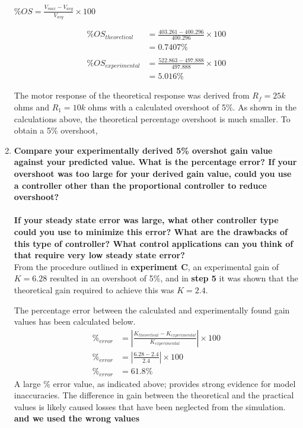 \documentclass[11pt,a4paper]{article}
\begin{document}
\begin{enumerate}
	\begin{center}
		$\%OS = \frac{V_{max} - V_{avg}}{V_{avg}} \times 100$
	\end{center}
	\begin{align*}		
	    \%OS_{theoretical} &= \frac{403.261 - 400.296}{400.296} \times 100 \\
	    &= 0.7407\% \\\\
	    \%OS_{experimental} &= \frac{522.863 - 497.888}{497.888} \times 100 \\
	    &= 5.016\% 
	\end{align*}

	The motor response of the theoretical response was derived from $R_f = 25k$ ohms and $R_1 = 10k$ ohms with a calculated overshoot of 5\%. As shown in the calculations above, the theoretical percentage overshoot is much smaller. To obtain a 5\% overshoot, \\

    

    \pagebreak
	\item \textbf{Compare your experimentally derived 5\% overshot gain value against your predicted value. What is the percentage error? If your overshoot was too large for your derived gain value, could you use a controller other than the proportional controller to reduce overshoot? \\\\
If your steady state error was large, what other controller type could you use to minimize this error? What are  the drawbacks of  this  type of controller? What control applications can you think of that require very low steady state error?}\\

From the procedure outlined in \textbf{experiment C}, an experimental gain of $K = 6.28$ resulted in an overshoot of 5\%, and in \textbf{step 5} it was shown that the theoretical gain required to achieve this was $K = 2.4$.

The percentage error between the calculated and experimentally found gain values has been calculated below.
\begin{align*}
\%_{error} &= |\frac{K_{theoretical} - K_{experimental}}{K_{experimental}}| \times 100 \\
\%_{error} &= |\frac{6.28 - 2.4}{2.4}| \times 100 \\
\%_{error} &= 61.8\% 
\end{align*}
A large \% error value, as indicated above; provides strong evidence for model inaccuracies. The difference in gain between the theoretical and the practical values is likely caused losses that have been neglected from the simulation. \textbf{and we used the wrong values} 


\end{enumerate}
\end{document}
